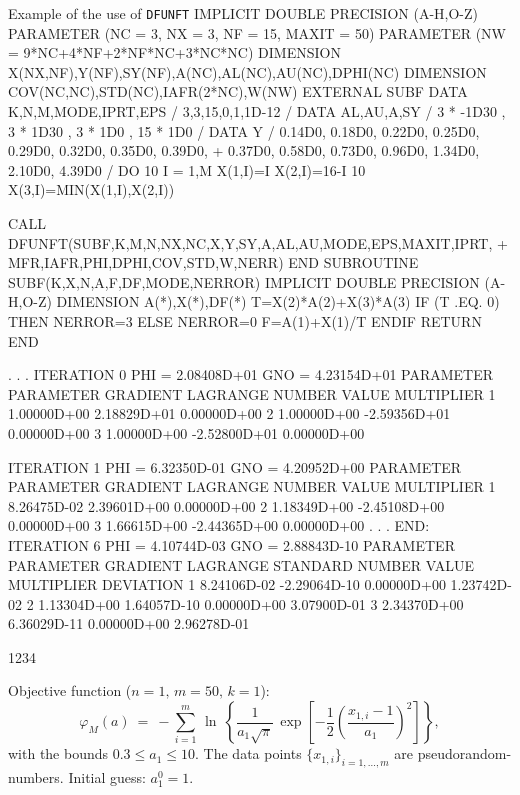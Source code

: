 \begin{XMPt}{Example of the use of {\tt DFUNFT}}
      IMPLICIT DOUBLE PRECISION (A-H,O-Z)
      PARAMETER (NC = 3, NX = 3, NF = 15, MAXIT = 50)
      PARAMETER (NW = 9*NC+4*NF+2*NF*NC+3*NC*NC)
      DIMENSION X(NX,NF),Y(NF),SY(NF),A(NC),AL(NC),AU(NC),DPHI(NC)
      DIMENSION COV(NC,NC),STD(NC),IAFR(2*NC),W(NW)
      EXTERNAL SUBF
      DATA K,N,M,MODE,IPRT,EPS / 3,3,15,0,1,1D-12 /
      DATA AL,AU,A,SY / 3 * -1D30 , 3 * 1D30 , 3 * 1D0 , 15 * 1D0 /
      DATA Y / 0.14D0, 0.18D0, 0.22D0, 0.25D0, 0.29D0, 0.32D0, 0.35D0, 0.39D0,
     +         0.37D0, 0.58D0, 0.73D0, 0.96D0, 1.34D0, 2.10D0, 4.39D0 /
      DO  10 I = 1,M
      X(1,I)=I
      X(2,I)=16-I
   10 X(3,I)=MIN(X(1,I),X(2,I))
 
      CALL DFUNFT(SUBF,K,M,N,NX,NC,X,Y,SY,A,AL,AU,MODE,EPS,MAXIT,IPRT,
     +            MFR,IAFR,PHI,DPHI,COV,STD,W,NERR)
      END
      SUBROUTINE SUBF(K,X,N,A,F,DF,MODE,NERROR)
      IMPLICIT DOUBLE PRECISION (A-H,O-Z)
      DIMENSION A(*),X(*),DF(*)
      T=X(2)*A(2)+X(3)*A(3)
      IF (T .EQ. 0) THEN
       NERROR=3
      ELSE
       NERROR=0
       F=A(1)+X(1)/T
      ENDIF
      RETURN
      END
\end{XMPt}
\newpage
\begin{Listing}
   . . .
       ITERATION 0 PHI =  2.08408D+01  GNO =  4.23154D+01
       PARAMETER   PARAMETER     GRADIENT    LAGRANGE
        NUMBER       VALUE                  MULTIPLIER
          1      1.00000D+00  2.18829D+01  0.00000D+00
          2      1.00000D+00 -2.59356D+01  0.00000D+00
          3      1.00000D+00 -2.52800D+01  0.00000D+00
 
       ITERATION 1 PHI =  6.32350D-01  GNO =  4.20952D+00
       PARAMETER   PARAMETER     GRADIENT    LAGRANGE
         NUMBER      VALUE                  MULTIPLIER
          1      8.26475D-02  2.39601D+00  0.00000D+00
          2      1.18349D+00 -2.45108D+00  0.00000D+00
          3      1.66615D+00 -2.44365D+00  0.00000D+00
     . . .
  END: ITERATION 6 PHI =  4.10744D-03  GNO =  2.88843D-10
       PARAMETER   PARAMETER     GRADIENT    LAGRANGE    STANDARD
         NUMBER      VALUE                  MULTIPLIER   DEVIATION
          1      8.24106D-02 -2.29064D-10  0.00000D+00  1.23742D-02
          2      1.13304D+00  1.64057D-10  0.00000D+00  3.07900D-01
          3      2.34370D+00  6.36029D-11  0.00000D+00  2.96278D-01
\end{Listing}
\newpage 
\begin{DL}{1234}
\item[\mathbf{(M)}]
Objective function ($n=1,\,m=50,\,k=1$):
$$ \varphi_M(a) \ = \  -\sum_{i=1}^m\,\ln\:\left\{
\frac{1}{a_1\sqrt{\pi}} \, \exp \left[-\frac{1}{2}
\left(\frac{x_{1,i}-1}{a_1} \right)^2 \right] \right\},$$
with the bounds $0.3 \le a_1 \le 10$. The data points
$\{x_{1,i}\}_{i=1,\ldots,m}$ are pseudorandom-numbers.
Initial guess: $a_1^0=1$.
\end{DL}

